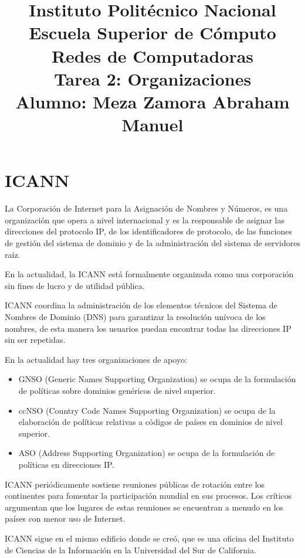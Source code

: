 \documentclass[a4paper,12pt]{article}
\begin{document}
\title{\Large Instituto Politécnico Nacional\\Escuela Superior de Cómputo\\Redes de Computadoras\\Tarea 2: Organizaciones\\Alumno: Meza Zamora Abraham Manuel}
\date{}
\maketitle

\section{ICANN}
La Corporación de Internet para la Asignación de Nombres y Números, es una organización que opera a nivel internacional y es la responsable de asignar las direcciones del protocolo IP, de los identificadores de protocolo, de las funciones de gestión del sistema de dominio y de la administración del sistema de servidores raíz.

En la actualidad, la ICANN está formalmente organizada como una corporación sin fines de lucro y de utilidad pública.

ICANN coordina la administración de los elementos técnicos del Sistema de Nombres de Dominio (DNS) para garantizar la resolución unívoca de los nombres, de esta manera los usuarios puedan encontrar todas las direcciones IP sin ser repetidas.

En la actualidad hay tres organizaciones de apoyo: 
\begin{itemize}
\item GNSO (Generic Names Supporting Organization) se ocupa de la formulación de políticas sobre
dominios genéricos de nivel superior.
\item ccNSO (Country Code Names Supporting Organization) se ocupa de la elaboración de políticas relativas a códigos de países en dominios de nivel superior.
\item ASO (Address Supporting Organization) se ocupa de la formulación de políticas en direcciones IP.
\end{itemize}

ICANN periódicamente sostiene reuniones públicas de rotación entre los continentes para fomentar la participación mundial en sus procesos. Los críticos argumentan que los lugares de estas reuniones se encuentran a menudo en los países con menor uso de Internet. 

ICANN sigue en el mismo edificio donde se creó, que es una oficina del Instituto de Ciencias de la Información en la Universidad del Sur de California.
\end{document}
